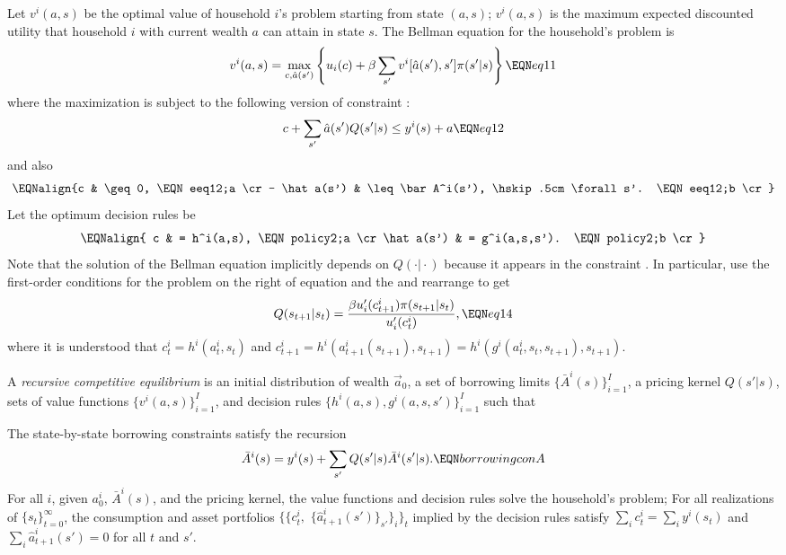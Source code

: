 Let $v^i(a,s)$ be the optimal value of household $i$'s problem
starting from state $(a, s)$;     $v^i(a,s)$ is the maximum
expected discounted utility  that household $i$ with current wealth $a$
can attain in state $s$.
The Bellman equation for the household's problem is
$$ v^i(a, s) = \max_{c, \hat a(s')} \left\{ u_i(c) + \beta
\sum_{s'} v^i[\hat a(s'),s'] \pi (s' | s) \right\} \EQN eq11 $$
where the maximization is subject to the following version
of constraint :
$$ c + \sum_{s'} \hat a(s') Q(s' | s)
     \leq  y^i(s) + a  \EQN eq12   $$
and also
$$\EQNalign{c & \geq 0, \EQN eeq12;a \cr
           -   \hat a(s') & \leq \bar A^i(s'), \hskip.5cm \forall s'.   \EQN eeq12;b \cr}$$
Let the optimum decision rules be
$$\EQNalign{ c & =  h^i(a,s), \EQN policy2;a \cr
            \hat a(s') & = g^i(a,s,s').  \EQN policy2;b \cr}$$
Note that the solution of the Bellman equation implicitly depends
on $Q(\cdot \vert \cdot)$ because it appears in the constraint
. In particular, use the first-order conditions for  the
problem on the right of equation  and the
 and rearrange to get
$$ Q(s_{t+1} | s_t ) = {\beta u'_i(c_{t+1}^i) \pi(s_{t+1} | s_t)
                 \over u'_i(c_t^i) }, \EQN eq14 $$
where it is understood that $c_t^i = h^i(a_t^i,s_t)$
and
$c_{t+1}^i = h^i(a_{t+1}^i(s_{t+1}), s_{t+1})
= h^i(g^i(a_t^i,s_t,s_{t+1}), s_{t+1})$.












\medskip{} A {\it  recursive competitive equilibrium} is
an initial distribution of wealth $\vec a_0$, a set of borrowing limits $\{\bar A^i(s)\}_{i=1}^I$,
a pricing kernel $Q(s' | s)$, sets of value functions $\{v^i(a,s)\}_{i=1}^I$, and
decision rules $\{h^i(a,s), g^i(a,s,s')\}_{i=1}^I$ such
that

 The state-by-state borrowing constraints satisfy the recursion
$$ \bar A^i(s) = y^i(s) + \sum_{s'} Q(s'|s) \bar A^i(s'|s).  \EQN borrowingconA $$
\medskip
{} For all $i$, given
 $a^i_0$, $\bar A^i(s)$,  and the pricing kernel, the value functions and decision rules
solve the household's problem;
\medskip
{} For all realizations of $\{s_t\}_{t=0}^\infty$, the consumption and asset
portfolios $\{\{c^i_t,$
$\{\hat a^i_{t+1}(s')\}_{s'}\}_i\}_t$ implied by the
decision rules satisfy $\sum_i c^i_t = \sum_i y^i(s_t)$ and
$\sum_i \hat a_{t+1}^i(s') = 0$
for all $t$ and $s'$.
\medskip
\noindent {}


